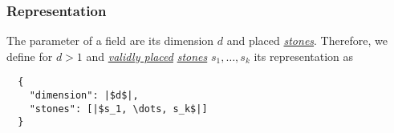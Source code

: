 \documentclass{scrartcl}
\begin{document}
\subsubsection{Representation}
The parameter of a field are its dimension $d$ and placed 
\hyperlink{stone}{\emph{stones}}. Therefore, we define for $d > 1$ and
\hyperlink{valid}{\emph{validly placed}} \hyperlink{stone}{\emph{stones}}
$s_{1}, \dots, s_{k}$ its representation as
\begin{verbatim}
  {
    "dimension": |$d$|,
    "stones": [|$s_1, \dots, s_k$|]
  }
\end{verbatim}
\end{document}
